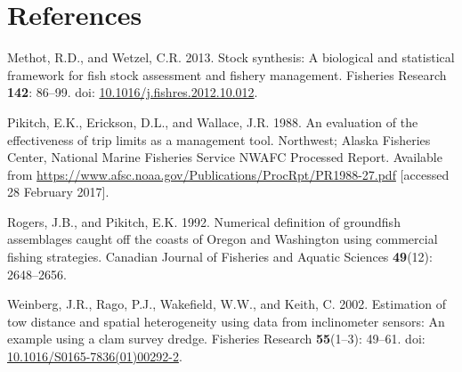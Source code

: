 \documentclass[12pt,]{article}
\begin{document}
\FloatBarrier

\newpage

\color{black}

\section{References}\label{references}

\renewcommand{\thepage}{}

\hypertarget{refs}{}
\hypertarget{ref-methot_stock_2013}{}
Methot, R.D., and Wetzel, C.R. 2013. Stock synthesis: A biological and
statistical framework for fish stock assessment and fishery management.
Fisheries Research \textbf{142}: 86--99. doi:
\href{https://doi.org/10.1016/j.fishres.2012.10.012}{10.1016/j.fishres.2012.10.012}.

\hypertarget{ref-pikitch_evaluation_1988}{}
Pikitch, E.K., Erickson, D.L., and Wallace, J.R. 1988. An evaluation of
the effectiveness of trip limits as a management tool. Northwest; Alaska
Fisheries Center, National Marine Fisheries Service NWAFC Processed
Report. Available from
\url{https://www.afsc.noaa.gov/Publications/ProcRpt/PR1988-27.pdf}
{[}accessed 28 February 2017{]}.

\hypertarget{ref-rogers_numerical_1992}{}
Rogers, J.B., and Pikitch, E.K. 1992. Numerical definition of groundfish
assemblages caught off the coasts of Oregon and Washington using
commercial fishing strategies. Canadian Journal of Fisheries and Aquatic
Sciences \textbf{49}(12): 2648--2656.

\hypertarget{ref-weinberg_estimation_2002}{}
Weinberg, J.R., Rago, P.J., Wakefield, W.W., and Keith, C. 2002.
Estimation of tow distance and spatial heterogeneity using data from
inclinometer sensors: An example using a clam survey dredge. Fisheries
Research \textbf{55}(1--3): 49--61. doi:
\href{https://doi.org/10.1016/S0165-7836(01)00292-2}{10.1016/S0165-7836(01)00292-2}.
\end{document}
